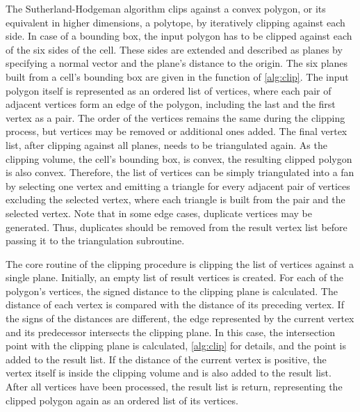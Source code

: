 The Sutherland-Hodgeman algorithm clips against a convex polygon, or its equivalent in higher dimensions, \ie a polytope, by iteratively clipping against each side.
In case of a bounding box, the input polygon has to be clipped against each of the six sides of the cell.
These sides are extended and described as planes by specifying a normal vector and the plane's distance to the origin.
The six planes built from a cell's bounding box are given in the  function of \cref{alg:clip}.
The input polygon itself is represented as an ordered list of vertices, where each pair of adjacent vertices form an edge of the polygon, including the last and the first vertex as a pair.
The order of the vertices remains the same during the clipping process, but vertices may be removed or additional ones added.
The final vertex list, after clipping against all planes, needs to be triangulated again.
As the clipping volume, \ie the cell's bounding box, is convex, the resulting clipped polygon is also convex.
Therefore, the list of vertices can be simply triangulated into a fan by selecting one vertex and emitting a triangle for every adjacent pair of vertices excluding the selected vertex, where each triangle is built from the pair and the selected vertex.
Note that in some edge cases, duplicate vertices may be generated.
Thus, duplicates should be removed from the result vertex list before passing it to the triangulation subroutine.

The core routine of the clipping procedure is clipping the list of vertices against a single plane.
Initially, an empty list of result vertices is created.
For each of the polygon's vertices, the signed distance to the clipping plane is calculated.
The distance of each vertex is compared with the distance of its preceding vertex.
If the signs of the distances are different, the edge represented by the current vertex and its predecessor intersects the clipping plane.
In this case, the intersection point with the clipping plane is calculated, \cf \cref{alg:clip} for details, and the point is added to the result list.
If the distance of the current vertex is positive, the vertex itself is inside the clipping volume and is also added to the result list.
After all vertices have been processed, the result list is return, representing the clipped polygon again as an ordered list of its vertices.

